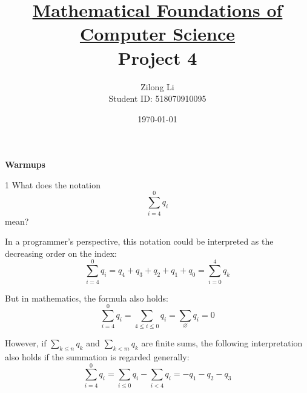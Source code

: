 \documentclass[a4paper,12pt]{article}
\title{\small \underline{Mathematical Foundations of Computer Science}\\\Large Project 4}
\author{Zilong Li\\\small Student ID: 518070910095}
\date{\today}
\makeatletter
\newtheorem*{solution}{Solution}
\theoremstyle{definition}
\renewenvironment{solution}[1][Solution] {\par\pushQED{\qed}\normalfont\topsep6\p@\@plus6\p@\relax\trivlist\item[\hskip\labelsep\bfseries#1\@addpunct{.}]\ignorespaces}{\popQED\endtrivlist\@endpefalse} \makeatother
\newenvironment{problems}{\begin{list}{}{\renewcommand{\makelabel}[1]{\textbf{##1}\hfil}}}{\end{list}}
\makeatother
\begin{document}
\maketitle

\noindent\textbf{Warmups}

\begin{problems}
    \item[1] What does the notation
    \begin{equation*}
        \sum_{i=4}^0 q_i
    \end{equation*} 
    mean?
    \begin{solution}
        In a programmer's perspective, this notation could be interpreted as the decreasing order on the index:
        \begin{equation*}
            \sum_{i=4}^0 q_i = q_4 + q_3 + q_2 + q_1 + q_0 = \sum_{i=0}^4 q_k
        \end{equation*}
        
        But in mathematics, the formula also holds:
        \begin{equation*}
            \sum_{i=4}^0 q_i = \sum_{4\leq i \leq 0} q_i = \sum_{\varnothing} q_i = 0
        \end{equation*}

        However, if $\sum_{k\leq n}q_k$ and $\sum_{k<m} q_k$ are finite sums, the following interpretation also holds if the summation is regarded generally:
        \begin{equation*}
            \sum_{i=4}^0 q_i = \sum_{i\leq 0} q_i - \sum_{i<4} q_i = -q_1-q_2-q_3
        \end{equation*}


\end{solution}
\end{problems}
\end{document}
